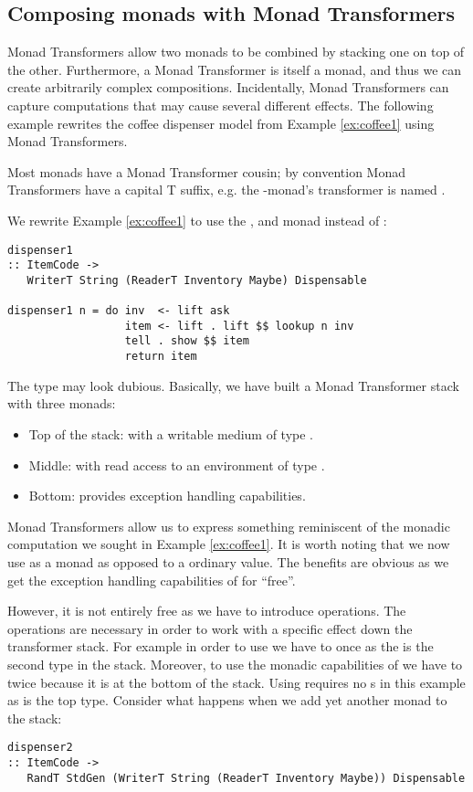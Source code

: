 \subsection{Composing monads with Monad Transformers}\label{sec:mt}
Monad Transformers allow two monads to be combined by stacking one on top of the other. 
Furthermore, a Monad Transformer is itself a monad, and thus we can create arbitrarily complex compositions.
Incidentally, Monad Transformers can capture computations that may cause several different effects.
The following example rewrites the coffee dispenser model from Example \ref{ex:coffee1} using Monad Transformers.
\begin{example}\label{ex:coffee2}
Most monads have a Monad Transformer cousin; by convention Monad Transformers have a capital T suffix, e.g. the -monad's transformer is named .

We rewrite Example \ref{ex:coffee1} to use the , and  monad instead of :
\begin{lstlisting}[style={haskell}]
dispenser1 
:: ItemCode -> 
   WriterT String (ReaderT Inventory Maybe) Dispensable

dispenser1 n = do inv  <- lift ask
                  item <- lift . lift $$ lookup n inv
                  tell . show $$ item
                  return item
\end{lstlisting}
The type may look dubious. Basically, we have built a Monad Transformer stack with three monads:
\begin{itemize}
  \item Top of the stack:  with a writable medium of type .
  \item Middle:  with read access to an environment of type .
  \item Bottom:  provides exception handling capabilities.
\end{itemize}
Monad Transformers allow us to express something reminiscent of the monadic computation we sought in Example \ref{ex:coffee1}. It is worth noting that we now use  as a monad as opposed to a ordinary value. The benefits are obvious as we get the exception handling capabilities of  for ``free''.

However, it is not entirely free as we have to introduce  operations. The  operations are necessary in order to work with a specific effect down the transformer stack. For example in order to use  we have to  once as the  is the second type in the stack. Moreover, to use the monadic capabilities of  we have to  twice because it is at the bottom of the stack. Using  requires no s in this example as  is the top type. 
Consider what happens when we add yet another monad to the stack:
\begin{lstlisting}[style={haskell}]
dispenser2 
:: ItemCode -> 
   RandT StdGen (WriterT String (ReaderT Inventory Maybe)) Dispensable


\end{lstlisting}
\end{example}
